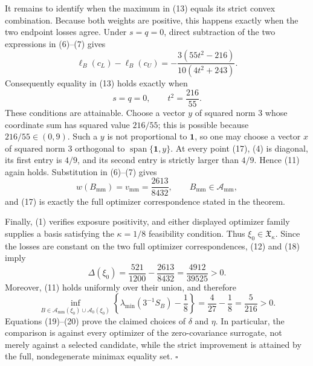 It remains to identify when the maximum in (13) equals its strict convex
combination.  Because both weights are positive, this happens exactly when
the two endpoint losses agree.  Under \(s=q=0\), direct subtraction of the
two expressions in (6)--(7) gives
\[
 \ell_B(c_L)-\ell_B(c_U)
 =-\frac{3(55t^2-216)}{10(4t^2+243)}.
 \tag{16}
\]
Consequently equality in (13) holds exactly when
\[
 s=q=0,
 \qquad
 t^2=\frac{216}{55}.
 \tag{17}
\]
These conditions are attainable.  Choose a vector \(y\) of squared norm
\(3\) whose coordinate sum has squared value \(216/55\); this is possible
because \(216/55\in(0,9)\).  Such a \(y\) is not proportional to
\(\mathbf1\), so one may choose a vector \(x\) of squared norm \(3\)
orthogonal to \(\operatorname{span}\{\mathbf1,y\}\).  At every point (17),
(4) is diagonal, its first entry is \(4/9\), and its second entry is strictly
larger than \(4/9\).  Hence (11) again holds.  Substitution in (6)--(7) gives
\[
 w(B_{\mathrm{mm}})=v_{\mathrm{mm}}=\frac{2613}{8432},
 \qquad B_{\mathrm{mm}}\in\mathcal A_{\mathrm{mm}},
 \tag{18}
\]
and (17) is exactly the full optimizer correspondence stated in the theorem.

Finally, (1) verifies exposure positivity, and either displayed optimizer
family supplies a basis satisfying the \(\kappa=1/8\) feasibility condition.
Thus \(\xi_0\in\mathfrak X_{\kappa}\).  Since the losses are constant on the
two full optimizer correspondences, (12) and (18) imply
\[
 \Delta(\xi_0)
 =\frac{521}{1200}-\frac{2613}{8432}
 =\frac{4912}{39525}>0.
 \tag{19}
\]
Moreover, (11) holds uniformly over their union, and therefore
\[
 \inf_{B\in\mathcal A_{\mathrm{mm}}(\xi_0)\cup\mathcal A_0(\xi_0)}
 \left\{\lambda_{\min}(3^{-1}S_B)-\frac18\right\}
 =\frac4{27}-\frac18=\frac5{216}>0.
 \tag{20}
\]
Equations (19)--(20) prove the claimed choices of \(\delta\) and \(\eta\).
In particular, the comparison is against every optimizer of the
zero-covariance surrogate, not merely against a selected candidate, while
the strict improvement is attained by the full, nondegenerate minimax
equality set.  \(\square\)